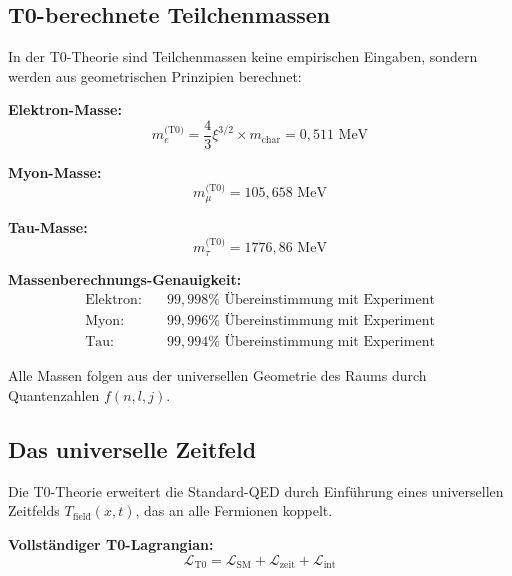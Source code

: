 \documentclass[12pt,a4paper]{article}
\numberwithin{equation}{section}
\newcommand{\calL}{\mathcal{L}}
\begin{document}
	\subsection{T0-berechnete Teilchenmassen}
	
	In der T0-Theorie sind Teilchenmassen keine empirischen Eingaben, sondern werden aus geometrischen Prinzipien berechnet:
	
	\textbf{Elektron-Masse:}
	\begin{equation}
		m_e^{\text{(T0)}} = \frac{4}{3} \xi^{3/2} \times m_{\text{char}} = 0{,}511 \text{ MeV}
	\end{equation}
	
	\textbf{Myon-Masse:}
	\begin{equation}
		m_\mu^{\text{(T0)}} = 105{,}658 \text{ MeV}
	\end{equation}
	
	\textbf{Tau-Masse:}
	\begin{equation}
		m_\tau^{\text{(T0)}} = 1776{,}86 \text{ MeV}
	\end{equation}
	
	\begin{t0berechnung}
		\textbf{Massenberechnungs-Genauigkeit:}
		\begin{align}
			\text{Elektron:} &\quad 99{,}998\% \text{ \"Ubereinstimmung mit Experiment}\\
			\text{Myon:} &\quad 99{,}996\% \text{ \"Ubereinstimmung mit Experiment}\\
			\text{Tau:} &\quad 99{,}994\% \text{ \"Ubereinstimmung mit Experiment}
		\end{align}
		
		Alle Massen folgen aus der universellen Geometrie des Raums durch Quantenzahlen $f(n,l,j)$.
	\end{t0berechnung}
	
	\subsection{Das universelle Zeitfeld}
	
	Die T0-Theorie erweitert die Standard-QED durch Einf\"uhrung eines universellen Zeitfelds $T_{\text{field}}(x,t)$, das an alle Fermionen koppelt.
	
	\textbf{Vollst\"andiger T0-Lagrangian:}
	\begin{equation}
		\calL_{\text{T0}} = \calL_{\text{SM}} + \calL_{\text{zeit}} + \calL_{\text{int}}
	\end{equation}
	
\end{document}
